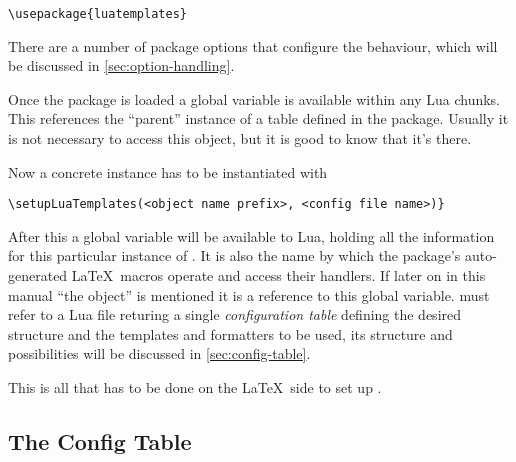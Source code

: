 \documentclass{scrartcl}
\begin{document}
\begin{verbatim}
\usepackage{luatemplates}
\end{verbatim}

\noindent There are a number of package options that configure the behaviour,
which will be discussed in \vref{sec:option-handling}.

Once the package is loaded a global variable  is
available within any Lua chunks.  This references the “parent” instance of a
 table defined in the package.  Usually it is not necessary to
access this object, but it is good to know that it's there.

Now a concrete instance has to be instantiated with

\begin{verbatim}
\setupLuaTemplates(<object name prefix>, <config file name>)}
\end{verbatim}

\noindent After this a global variable 
will be available to Lua, holding all the information for this particular
instance of . It is also the name by which the package's
auto-generated \LaTeX\ macros operate and access their handlers.  If later on in
this manual “the  object” is mentioned it is a reference to
this global variable.  must refer to a Lua file
returing a single \emph{configuration table} defining the desired structure and
the templates and formatters to be used, its structure and possibilities will be
discussed in \vref{sec:config-table}.

This is all that has to be done on the \LaTeX\ side to set up
.


\subsection{The Config Table}
\label{sec:config-table}
\end{document}
